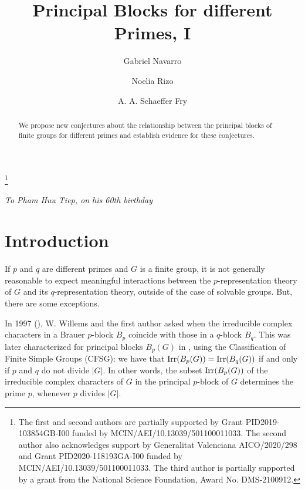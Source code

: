 \documentclass[12pt,leqno,a4paper]{amsart}
\def\irr#1{{\rm Irr}(#1)}
\theoremstyle{remark}
\begin{document}
\title[Principal Blocks for different Primes, I]{Principal Blocks for different Primes, I}



\author{Gabriel Navarro}
\address[G. Navarro]{Departament de Matem\`atiques, Universitat de Val\`encia, 46100 Burjassot,
       Val\`encia, Spain.}


\author{Noelia Rizo}
\address[N. Rizo]{Departamento de Matem\'aticas, Universidad de Oviedo, 33007, Oviedo, Spain}


\author{A. A. Schaeffer Fry}
\address[A. A. Schaeffer Fry]{Deptartment of  Mathematics and Statistics, Metropolitan State University of Denver, Denver, CO 80217, USA}
  

\thanks{The first and second authors are partially supported by Grant PID2019-103854GB-I00 funded by MCIN/AEI/10.13039/501100011033. The second author also acknowledges support by Generalitat Valenciana AICO/2020/298 and Grant PID2020-118193GA-I00 funded by MCIN/AEI/10.13039/501100011033.  The third author is partially supported by a grant from the National Science Foundation, Award No. DMS-2100912.}


\keywords{}


\begin{abstract}  
We propose new conjectures about the relationship between the principal blocks of finite groups
for different primes {and establish evidence for these conjectures}. \end{abstract}

\maketitle

\centerline{\sl To Pham Huu Tiep, on his 60th birthday}
\bigskip


\section{Introduction}
If $p$ and $q$ are different primes and $G$ is a finite group,
it is not generally reasonable to expect meaningful interactions between
the $p$-representation theory of $G$ and its $q$-representation theory, outside of the case of solvable groups.
But, there are some  exceptions.

\medskip

In 1997 (\cite{NW}), W. Willems and the first author asked when the irreducible
complex characters in a Brauer $p$-block $B_p$ coincide
with those in a $q$-block $B_q$. This was later characterized
 for  principal blocks $B_p(G)$ in \cite{BNOT}, using the Classification of Finite Simple Groups (CFSG): we have that 
 $\irr{B_p(G)}=\irr{B_q(G)}$  if and only if
 $p$ and $q$ do not divide $|G|$. In other words,
the subset $\irr{B_p(G)}$ of the irreducible complex characters of $G$ in the
principal $p$-block of $G$
determines the prime $p$, whenever $p$ divides $|G|$.
\end{document}
